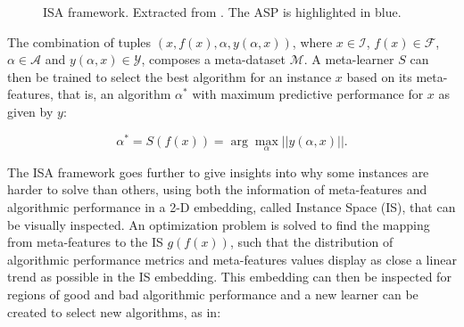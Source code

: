 \begin{figure}[ht]
	\caption{ISA framework. Extracted from . The ASP is highlighted in blue.} \label{fig:ISA_flowchart}
\end{figure}

The combination of tuples $(x, f(x), \alpha, y(\alpha, x))$, where $x \in \mathcal{I}$, $f(x) \in \mathcal{F}$, $\alpha \in \mathcal{A}$ and $y(\alpha, x) \in \mathcal{Y}$, composes a meta-dataset $\mathcal{M}$. A meta-learner $S$ can then be trained to select the best algorithm for an instance $x$ based on its meta-features, that is, an algorithm $\alpha^*$ with maximum predictive performance for $x$ as given by $y$: 

\begin{equation} \label{eq:algo_selection}
	\alpha^* = S(f(x)) = \arg \max_{\alpha} ||y(\alpha, x)||.
\end{equation}

The ISA framework goes further to give insights into why some instances are harder to solve than others, using both the information of meta-features and algorithmic performance in a 2-D embedding, called Instance Space (IS), that can be visually inspected. An optimization problem is solved to find the mapping from meta-features to the IS $g(f(x))$, such that the distribution of algorithmic performance metrics and meta-features values display as close a linear trend as possible in the IS embedding. This embedding can then be inspected for regions of good and bad algorithmic performance and a new learner can be created to select new algorithms, as in:

